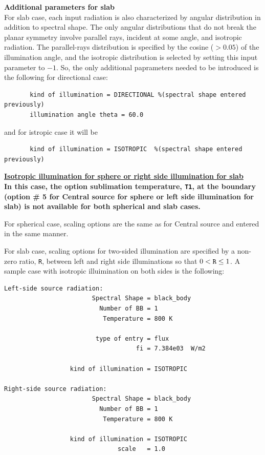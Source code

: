 \documentclass[11pt]{article}
\begin{document}
\newpage

{\bf Additional parameters for slab}\\

For slab case, each input radiation is also characterized by angular distribution in addition to
spectral shape. The only angular distributions that do not break the planar symmetry involve
parallel rays, incident at some angle, and isotropic radiation. The parallel-rays distribution
is specified by the cosine ($> 0.05$) of the illumination angle, and the isotropic distribution
is selected by setting this input parameter to $-1$. So, the only additional paprameters needed
to be introduced is the following for directional case:
\begin{verbatim}
       kind of illumination = DIRECTIONAL %(spectral shape entered previously)
       illumination angle theta = 60.0
\end{verbatim}
and for istropic case it will be
\begin{verbatim}
       kind of illumination = ISOTROPIC  %(spectral shape entered previously)
\end{verbatim}


{\bf\underline{Isotropic illumination for sphere or right side illumination for slab}}\\

{\bf In this case, the option sublimation temperature, {\tt T1}, at the boundary (option \# 5 for Central
source for sphere or left side illumination for slab) is not available for both spherical and slab
cases.}

For spherical case, scaling options are the same as for Central source and entered in the same manner.

For slab case, scaling options for two-sided illumination are specified by a non-zero ratio, {\tt R},
between left and right side illuminations so that  $0 < {\tt R} \le 1$. A sample case with isotropic
illuimination on both sides is the following:
\begin{verbatim}
Left-side source radiation:
                        Spectral Shape = black_body
                          Number of BB = 1
                           Temperature = 800 K

                         type of entry = flux
                                    fi = 7.384e03  W/m2

                  kind of illumination = ISOTROPIC

Right-side source radiation:
                        Spectral Shape = black_body
                          Number of BB = 1
                           Temperature = 800 K

                  kind of illumination = ISOTROPIC
                               scale   = 1.0
\end{verbatim}
\end{document}
